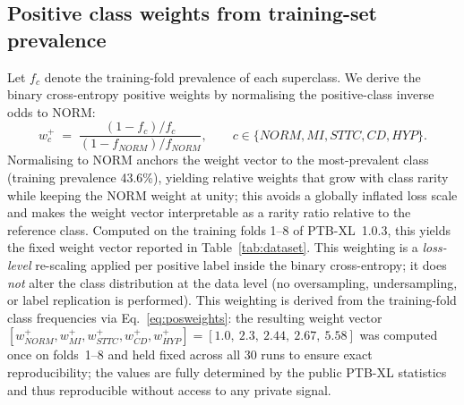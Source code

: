 \documentclass[mathematics,article,submit,pdftex]{Definitions/mdpi}
\def\mathrm#1{#1}%
\begin{document}
\subsection{Positive class weights from training-set prevalence}
Let $f_c$ denote the training-fold prevalence of each superclass. We derive the binary cross-entropy positive weights by normalising the positive-class inverse odds to NORM:
\begin{equation}\label{eq:posweights}
w_c^{+} \;=\; \frac{(1-f_c)/f_c}{(1-f_{\mathrm{NORM}})/f_{\mathrm{NORM}}}, \qquad c\in\{\mathrm{NORM},\mathrm{MI},\mathrm{STTC},\mathrm{CD},\mathrm{HYP}\}.
\end{equation}
Normalising to NORM anchors the weight vector to the most-prevalent class (training prevalence 43.6\%), yielding relative weights that grow with class rarity while keeping the NORM weight at unity; this avoids a globally inflated loss scale and makes the weight vector interpretable as a rarity ratio relative to the reference class. Computed on the training folds 1--8 of PTB-XL~1.0.3, this yields the fixed weight vector reported in Table~\ref{tab:dataset}. This weighting is a \emph{loss-level} re-scaling applied per positive label inside the binary cross-entropy; it does \emph{not} alter the class distribution at the data level (no oversampling, undersampling, or label replication is performed). This weighting is derived from the training-fold class frequencies via Eq.~\eqref{eq:posweights}: the resulting weight vector $[w_{\mathrm{NORM}}^+, w_{\mathrm{MI}}^+, w_{\mathrm{STTC}}^+, w_{\mathrm{CD}}^+, w_{\mathrm{HYP}}^+] = [1.0,\ 2.3,\ 2.44,\ 2.67,\ 5.58]$ was computed once on folds~1--8 and held fixed across all 30 runs to ensure exact reproducibility; the values are fully determined by the public PTB-XL statistics and thus reproducible without access to any private signal.
\end{document}
